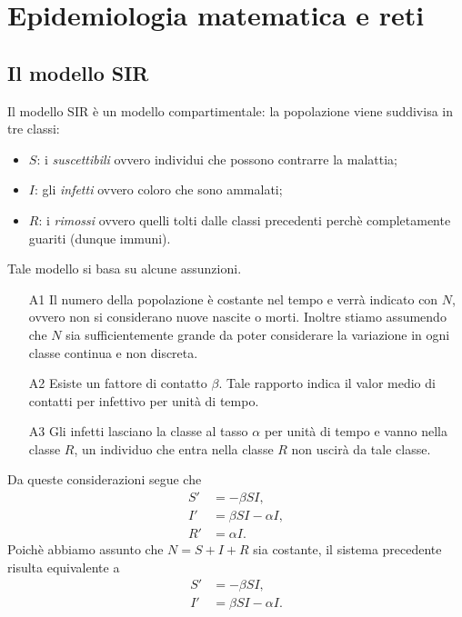 \chapter{Epidemiologia matematica e reti}
\section{Il modello SIR}{\label{modellosir}}
Il modello SIR \`e un modello compartimentale: la popolazione  viene suddivisa in tre classi: \begin{itemize}
	\item $S$: i \textit{suscettibili}  ovvero individui che possono contrarre la malattia;
	\item $I$: gli \textit{infetti} ovvero coloro che sono ammalati;
	\item $R$: i \textit{rimossi} ovvero  quelli tolti dalle classi precedenti perch\`e completamente guariti (dunque immuni).
	\end{itemize}
	Tale modello si basa su alcune assunzioni.
	\begin{itemize}
		\item[A1] Il numero della popolazione \`e costante nel tempo e verr\`a indicato con $N$, ovvero non si considerano nuove nascite o morti. Inoltre stiamo assumendo che $N$ sia sufficientemente grande da poter considerare la variazione in ogni classe continua e non discreta.
\item[A2] Esiste un fattore di contatto  $\beta$. Tale rapporto indica il valor medio di contatti per infettivo per unit\`a di tempo.
		\item[A3] Gli infetti lasciano la classe al tasso $\alpha$ per unit\`a di tempo e vanno nella classe $R$, un individuo che entra nella classe $R$ non uscir\`a da tale classe.
	\end{itemize}
Da queste considerazioni segue che 
\begin{equation}
\label{SIR}
\begin{aligned}
  S'&=-\beta S I,\\
  I'&= \beta S I -\alpha I,\\
  R'&=\alpha I.
\end{aligned}
\end{equation}
Poich\`e abbiamo assunto che $N=S+I+R$ sia costante, il sistema precedente risulta equivalente a 
\begin{equation}
\label{SI}
\begin{aligned}
  S'&=-\beta S I,\\
  I'&= \beta S I -\alpha I.
\end{aligned}
\end{equation}\\ 
